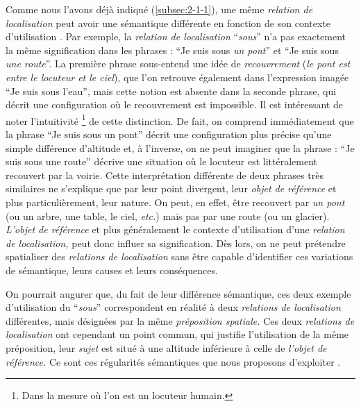 Comme nous l'avons déjà indiqué (\autoref{subsec:2-1-1}), une même
\emph{relation de localisation} peut avoir une sémantique différente
en fonction de son contexte d'utilisation
\autocite[16]{Borillo1998}. Par exemple, la \emph{relation de
  localisation} \enquote{\emph{sous}} n'a pas exactement la même
signification dans les phrases : \enquote{Je suis sous \emph{un pont}}
et \enquote{Je suis sous \emph{une route}}. La première phrase
sous-entend une idée de \emph{recouvrement} (\ie \emph{le pont est
  entre le locuteur et le ciel}), que l'on retrouve également dans
l'expression imagée \enquote{Je suis sous l'eau}, mais cette notion
est absente dans la seconde phrase, qui décrit une configuration où le
recouvrement est impossible. Il est intéressant de noter l'intuitivité
\footnote{Dans la mesure où l'on est un locuteur humain.} de cette
distinction. De fait, on comprend immédiatement que la phrase
\enquote{Je suis sous un pont} décrit une configuration plus précise
qu'une simple différence d'altitude et, à l'inverse, on ne peut
imaginer que la phrase : \enquote{Je suis sous une route} décrive une
situation où le locuteur est littéralement recouvert par la
voirie. Cette interprétation différente de deux phrases très
similaires ne s'explique que par leur point divergent, leur
\emph{objet de référence} et plus particulièrement, leur nature. On
peut, en effet, être recouvert par \emph{un pont} (ou un arbre, une
table, le ciel, \emph{etc.}) mais pas par une route (ou un
glacier). \emph{L'objet de référence} et plus généralement le contexte
d'utilisation d'une \emph{relation de localisation,} peut donc influer
sa signification. Dès lors, on ne peut prétendre spatialiser des
\emph{relations de localisation} sans être capable d'identifier ces
variations de sémantique, leurs causes et leurs conséquences.

%
On pourrait augurer que, du fait de leur différence sémantique, ces
deux exemple d'utilisation du \enquote{\emph{sous}} correspondent en
réalité à deux \emph{relations de localisation} différentes, mais
désignées par la même \emph{préposition spatiale.}
%
Ces deux \emph{relations de localisation} ont cependant un point
commun, qui justifie l'utilisation de la même préposition, leur
\emph{sujet} est situé à une altitude inférieure à celle de
\emph{l'objet de référence.} Ce sont ces régularités sémantiques que
nous proposons d'exploiter \autocite{Bunel2019a}.

